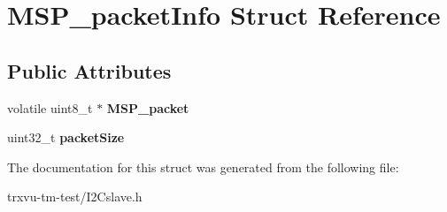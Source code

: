 \hypertarget{structMSP__packetInfo}{}\section{M\+S\+P\+\_\+packet\+Info Struct Reference}
\label{structMSP__packetInfo}
\subsection*{Public Attributes}
\begin{DoxyCompactItemize}
\item 
\mbox{\label{structMSP__packetInfo_aa846e2a65315099f8a7701e159ce84a7}} 
volatile uint8\+\_\+t $\ast$ {\bfseries M\+S\+P\+\_\+packet}
\item 
\mbox{\label{structMSP__packetInfo_a61066fb12e3b65bbae05507fe34148a4}} 
uint32\+\_\+t {\bfseries packet\+Size}
\end{DoxyCompactItemize}


The documentation for this struct was generated from the following file\+:\begin{DoxyCompactItemize}
\item 
trxvu-\/tm-\/test/I2\+Cslave.\+h\end{DoxyCompactItemize}

